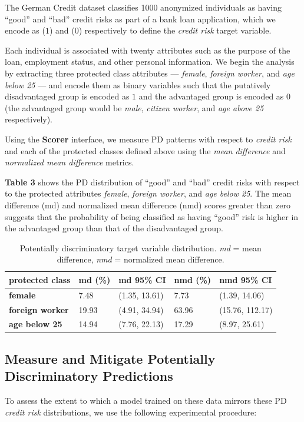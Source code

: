 \documentclass{acm_proc_article-sp}
\begin{document}
The German Credit dataset classifies 1000 anonymized individuals as having
``good'' and ``bad'' credit risks as part of a bank loan application, which we
encode as (\(1\)) and (\(0\)) respectively to define the \emph{credit risk}
target variable.

Each individual is associated with twenty attributes such as the purpose of the
loan, employment status, and other personal information. We begin the analysis
by extracting three protected class attributes --- \emph{female},
\emph{foreign worker}, and \emph{age below 25} --- and encode them as binary
variables such that the putatively disadvantaged group is encoded as \(1\) and
the advantaged group is encoded as \(0\) (the advantaged group would be
\emph{male}, \emph{citizen worker}, and \emph{age above 25} respectively).

Using the \textbf{Scorer} interface, we measure PD patterns with respect to
\emph{credit risk} and each of the protected classes defined above using the
\emph{mean difference} and \emph{normalized mean difference} metrics.

\textbf{Table 3} shows the PD distribution of ``good'' and ``bad'' credit risks
with respect to the protected attributes \emph{female}, \emph{foreign
worker}, and \emph{age below 25}. The mean difference (md) and normalized mean
difference (nmd) scores greater than zero suggests that the probability
of being classified as having ``good'' risk is higher in the advantaged group
than that of the disadvantaged group.

\begin{table}
  \caption{Potentially discriminatory target variable distribution.
    \emph{md} = mean difference, \emph{nmd} = normalized mean difference.}
  \renewcommand{\arraystretch}{1.75}
  \small\noindent\begin{tabularx}{\linewidth}{l|X|X|X|X}
    \textbf{protected class} & \textbf{md (\%)} & \textbf{md 95\% CI} &
      \textbf{nmd (\%)} & \textbf{nmd 95\% CI}\\
    \hline
    \textbf{female} & 7.48 & (1.35, 13.61) & 7.73 & (1.39, 14.06) \\
    \textbf{foreign worker} & 19.93 & (4.91, 34.94) & 63.96 & (15.76, 112.17)\\
    \textbf{age below 25} & 14.94 & (7.76, 22.13) & 17.29 & (8.97, 25.61)\\
  \end{tabularx}
\end{table}

\subsection{Measure and Mitigate Potentially Discriminatory Predictions}
To assess the extent to which a model trained on these data mirrors these PD
\emph{credit risk} distributions, we use the following experimental procedure:
\end{document}
